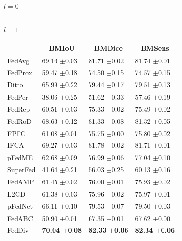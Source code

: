 \documentclass[journal]{IEEEtran}
\begin{document}
\begin{table}
\begin{subtable}[]{$l=0$}
\begin{tabular}{@{}llll@{}}
		\end{tabular}
	\end{subtable}
	\centering
	\begin{subtable}[]{$l=1$}
		\begin{tabular}{@{}llll@{}}
			\toprule
			& \multicolumn{1}{c}{BMIoU} & \multicolumn{1}{c}{BMDice} & \multicolumn{1}{c}{BMSens} \\ \midrule
			FedAvg   & 69.16 $\pm$0.03          & 81.71 $\pm$0.02          & 81.74 $\pm$0.01          \\
			FedProx  & 59.47 $\pm$0.18          & 74.50 $\pm$0.15          & 74.57 $\pm$0.15          \\
			Ditto    & 65.99 $\pm$0.22          & 79.44 $\pm$0.17          & 79.51 $\pm$0.13          \\
			FedPer   & 38.06 $\pm$0.25          & 51.62 $\pm$0.33          & 57.46 $\pm$0.19          \\
			FedRep   & 60.51 $\pm$0.03          & 75.33 $\pm$0.02          & 75.49 $\pm$0.02          \\
			FedRoD   & 68.63 $\pm$0.12          & 81.33 $\pm$0.08          & 81.32 $\pm$0.05          \\
			FPFC     & 61.08 $\pm$0.01          & 75.75 $\pm$0.00          & 75.80 $\pm$0.02          \\
			IFCA     & 69.27 $\pm$0.03          & 81.78 $\pm$0.02          & 81.71 $\pm$0.01          \\
			pFedME   & 62.68 $\pm$0.09          & 76.99 $\pm$0.06          & 77.04 $\pm$0.10          \\
			SuperFed & 41.64 $\pm$0.21          & 56.03 $\pm$0.25          & 60.13 $\pm$0.16          \\
			FedAMP   & 61.45 $\pm$0.02          & 76.00 $\pm$0.01          & 75.93 $\pm$0.02          \\
			L2GD   & 61.38 $\pm$0.03          & 75.96 $\pm$0.02          & 75.97 $\pm$0.01          \\
			pFedNet  & 66.11 $\pm$0.10          & 79.53 $\pm$0.07          & 79.50 $\pm$0.03          \\
			FedABC   & 50.90 $\pm$0.01          & 67.35 $\pm$0.01          & 67.62 $\pm$0.00          \\
			FedDiv   & \textbf{70.04 $\pm$0.08} & \textbf{82.33 $\pm$0.06} & \textbf{82.34 $\pm$0.06} \\ \bottomrule
		\end{tabular}
	\end{subtable}
	\centering
	\\

\end{table}
\end{document}
